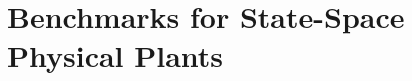\documentclass[runningheads,a4paper]{llncs}
\newcommand{\mat}[1]{\boldsymbol{#1}}
\begin{document}
%

\section{Benchmarks for State-Space Physical Plants}
\label{sec:BenchmarksforStateSpace}
\end{document}
